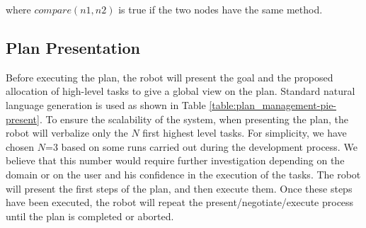 where $compare(n1,n2)$ is true if the two nodes have the same method.

\subsection{Plan Presentation}
Before executing the plan, the robot will present the goal and the proposed allocation of high-level tasks to give a global view on the plan. Standard natural language generation is used as shown in Table \ref{table:plan_management-pie-present}. 
To ensure the scalability of the system, when presenting the plan, the robot will verbalize only the $N$ first highest level tasks. For simplicity, we have chosen $N$=$3$ based on some runs carried out during the development process. We believe that this number would require further investigation depending on the domain or on the user and his confidence in the execution of the tasks. The robot will present the first steps of the plan, and then execute them. Once these steps have been executed, the robot will repeat the present/negotiate/execute process until the plan is completed or aborted.



 
